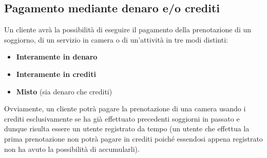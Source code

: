 \documentclass [a4paper, 12pt]{book}
\begin{document}
\medskip

\subsection{Pagamento mediante denaro e/o crediti}
Un cliente avrà la possibilità di eseguire il pagamento della prenotazione di un soggiorno, di un servizio in camera o di un'attività in tre modi distinti:
\begin{itemize}
\item \textbf{Interamente in denaro}
\item \textbf{Interamente in crediti}
\item \textbf{Misto} (sia denaro che crediti)
\end{itemize}
Ovviamente, un cliente potrà pagare la prenotazione di una camera usando i crediti esclusivamente se ha già effettuato precedenti soggiorni in passato e dunque risulta essere un utente registrato da tempo (un utente che effettua la prima prenotazione non potrà pagare in crediti poiché essendosi appena registrato non ha avuto la possibilità di accumularli).

\medskip
\end{document}
